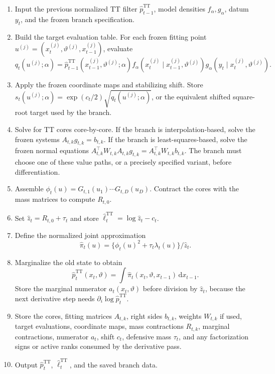 \documentclass[11pt]{article}
\newcommand{\dd}{\mathrm{d}}
\newcommand{\TT}{\mathrm{TT}}
\theoremstyle{definition}
\theoremstyle{remark}
\begin{document}
\begin{enumerate}[leftmargin=*]
\item Input the previous normalized TT filter
  \(\widehat p_{t-1}^{\TT}\), model densities \(f_\alpha,g_\alpha\), datum
  \(y_t\), and the frozen branch specification.
\item Build the target evaluation table.  For each frozen fitting point
  \(u^{(j)}=(x_t^{(j)},\vartheta^{(j)},x_{t-1}^{(j)})\), evaluate
  \[
    q_t(u^{(j)};\alpha)
    =
    \widehat p_{t-1}^{\TT}(x_{t-1}^{(j)},\vartheta^{(j)};\alpha)
    f_\alpha(x_t^{(j)}\mid x_{t-1}^{(j)},\vartheta^{(j)})
    g_\alpha(y_t\mid x_t^{(j)},\vartheta^{(j)}).
  \]
\item Apply the frozen coordinate maps and stabilizing shift.  Store
  \(s_t(u^{(j)};\alpha)=\exp(c_t/2)\sqrt{q_t(u^{(j)};\alpha)}\), or the
  equivalent shifted square-root target used by the branch.
\item Solve for TT cores core-by-core.  If the branch is interpolation-based,
  solve the frozen systems \(A_{t,k}g_{t,k}=b_{t,k}\).  If the branch is
  least-squares-based, solve the frozen normal equations
  \(A_{t,k}^{\top}W_{t,k}A_{t,k}g_{t,k}
  =A_{t,k}^{\top}W_{t,k}b_{t,k}\).  The branch must choose one of these value
  paths, or a precisely specified variant, before differentiation.
\item Assemble \(\phi_t(u)=G_{t,1}(u_1)\cdots G_{t,D}(u_D)\).  Contract the
  cores with the mass matrices to compute \(R_{t,0}\).
\item Set \(\widehat z_t=R_{t,0}+\tau_t\) and store
  \(\widehat\ell_t^{\TT}=\log\widehat z_t-c_t\).
\item Define the normalized joint approximation
  \[
    \widehat\pi_t(u)=
    \{\phi_t(u)^2+\tau_t\lambda_t(u)\}/\widehat z_t.
  \]
\item Marginalize the old state to obtain
  \[
    \widehat p_t^{\TT}(x_t,\vartheta)=
    \int\widehat\pi_t(x_t,\vartheta,x_{t-1})\,\dd x_{t-1}.
  \]
  Store the marginal numerator \(a_t(x_t,\vartheta)\) before division by
  \(\widehat z_t\), because the next derivative step needs
  \(\partial_i\log\widehat p_t^{\TT}\).
\item Store the cores, fitting matrices \(A_{t,k}\), right sides \(b_{t,k}\),
  weights \(W_{t,k}\) if used, target evaluations, coordinate maps, mass
  contractions \(R_{t,k}\), marginal contractions, numerator \(a_t\), shift
  \(c_t\), defensive mass \(\tau_t\), and any factorization signs or active
  ranks consumed by the derivative pass.
\item Output \(\widehat p_t^{\TT}\), \(\widehat\ell_t^{\TT}\), and the saved
  branch data.
\end{enumerate}
\end{document}
